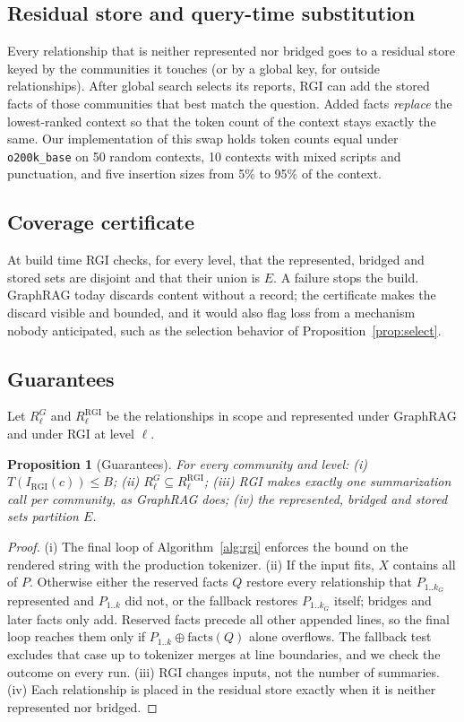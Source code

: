 \documentclass[journal]{IEEEtran}
\newtheorem{proposition}{Proposition}
\theoremstyle{remark}
\newcommand{\In}{I}
\newcommand{\tok}{T}
\begin{document}
\subsection{Residual store and query-time substitution}
Every relationship that is neither represented nor bridged goes to a residual store keyed by the communities it touches (or by a global key, for outside relationships). After global search selects its reports, RGI can add the stored facts of those communities that best match the question. Added facts \emph{replace} the lowest-ranked context so that the token count of the context stays exactly the same. Our implementation of this swap holds token counts equal under \texttt{o200k\_base} on 50 random contexts, 10 contexts with mixed scripts and punctuation, and five insertion sizes from 5\% to 95\% of the context.

\subsection{Coverage certificate}
At build time RGI checks, for every level, that the represented, bridged and stored sets are disjoint and that their union is $E$. A failure stops the build. GraphRAG today discards content without a record; the certificate makes the discard visible and bounded, and it would also flag loss from a mechanism nobody anticipated, such as the selection behavior of Proposition~\ref{prop:select}.

\subsection{Guarantees}
Let $R^G_\ell$ and $R^{\mathrm{RGI}}_\ell$ be the relationships in scope and represented under GraphRAG and under RGI at level $\ell$.

\begin{proposition}[Guarantees]\label{prop:guarantees}
For every community and level: (i) $\tok(\In_{\mathrm{RGI}}(c))\le B$; (ii) $R^G_\ell\subseteq R^{\mathrm{RGI}}_\ell$; (iii) RGI makes exactly one summarization call per community, as GraphRAG does; (iv) the represented, bridged and stored sets partition $E$.
\end{proposition}
\begin{proof}
(i) The final loop of Algorithm~\ref{alg:rgi} enforces the bound on the rendered string with the production tokenizer. (ii) If the input fits, $X$ contains all of $P$. Otherwise either the reserved facts $Q$ restore every relationship that $P_{1..k_G}$ represented and $P_{1..k}$ did not, or the fallback restores $P_{1..k_G}$ itself; bridges and later facts only add. Reserved facts precede all other appended lines, so the final loop reaches them only if $P_{1..k}\oplus\mathrm{facts}(Q)$ alone overflows. The fallback test excludes that case up to tokenizer merges at line boundaries, and we check the outcome on every run. (iii) RGI changes inputs, not the number of summaries. (iv) Each relationship is placed in the residual store exactly when it is neither represented nor bridged.
\end{proof}
\end{document}
